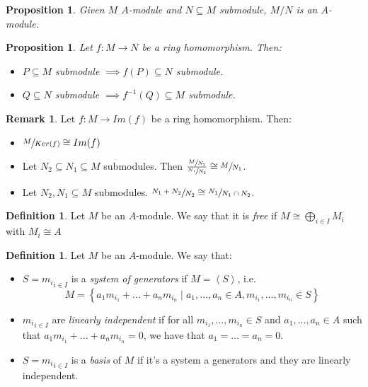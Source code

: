\documentclass[11pt]{article}
\newtheorem{prop}[theorem]{Proposition}
\theoremstyle{definition}
\newtheorem{defn}[theorem]{Definition}
\newtheorem{rk}[theorem]{Remark}
\begin{document}
        \begin{prop}
            Given $M$ $A$-module and $N \subseteq M$ submodule, $M/N$ is an $A$-module.
        \end{prop}

        \begin{prop}
            Let $f: M \longrightarrow N$ be a ring homomorphism.
            Then:
            \begin{itemize}
                \item $P \subseteq M$ submodule $\implies f(P) \subseteq N$ submodule.
                \item $Q \subseteq N$ submodule $\implies f^{-1}(Q) \subseteq M$ submodule.
            \end{itemize}
        \end{prop}

        \begin{rk}
            Let $f: M \longrightarrow Im(f)$ be a ring homomorphism.
            Then:
            \begin{itemize}
                \item $\sfrac{M}{Ker(f)} \cong Im(f)$
                \item Let $N_2 \subseteq N_1 \subseteq M$ submodules.
                Then $\frac{\sfrac{M}{N_2}}{\sfrac{N_1}{N_2}} \cong \sfrac{M}{N_1}$.
                \item Let $N_2, N_1 \subseteq M$ submodules.
                $\sfrac{N_1 + N_2}{N_2} \cong \sfrac{N_1}{N_1 \cap N_2}$.
            \end{itemize}
        \end{rk}

        \begin{defn}
            Let $M$ be an $A$-module.
            We say that it is \emph{free} if $M \cong \bigoplus_{i \in I} M_i$ with $M_i \cong A$
        \end{defn}

        \begin{defn}
            Let $M$ be an $A$-module.
            We say that:
            \begin{itemize}
                \item $S = {m_i}_{i \in I}$ is a \emph{system of generators} if $M = \left<S\right> $, i.e.
                \[
                    M = \left\{ a_1 m_{i_1} + \dots + a_n m_{i_n} \mid a_1, \dots, a_n \in A, m_{i_1}, \dots, m_{i_n} \in S \right\}
                \]
                \item ${m_i}_{i \in I}$ are \emph{linearly independent} if for all $m_{i_1}, \dots, m_{i_n} \in S$ and $a_1, \dots, a_n \in A$
                such that $a_1 m_{i_1} + \dots + a_n m_{i_n} = 0$, we have that $a_1 = \dots = a_n = 0$.
                \item $S = {m_i}_{i \in I}$ is a \emph{basis} of $M$ if it's a system a generators and they are linearly independent.
            \end{itemize}
        \end{defn}
\end{document}
